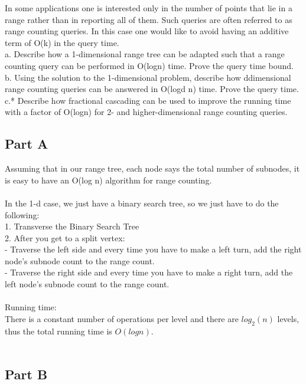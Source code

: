 \documentclass[11pt,psfig]{article}
\begin{document}
In some applications one is interested only in the number of points that
lie in a range rather than in reporting all of them. Such queries are often
referred to as range counting queries. In this case one would like to avoid
having an additive term of O(k) in the query time.\\
a. Describe how a 1-dimensional range tree can be adapted such that a
range counting query can be performed in O(logn) time. Prove the
query time bound.\\
b. Using the solution to the 1-dimensional problem, describe how ddimensional
range counting queries can be answered in O(logd n)
time. Prove the query time.\\
c.* Describe how fractional cascading can be used to improve the running
time with a factor of O(logn) for 2- and higher-dimensional range
counting queries.\\

\subsection*{Part A}

Assuming that in our range tree, each node says the total number of subnodes, it is easy to have an O(log n) algorithm for range counting. \\
\\
In the 1-d case, we just have a binary search tree, so we just have to do the following:\\
1. Transverse the Binary Search Tree\\
2. After you get to a split vertex:\\
- Traverse the left side and every time you have to make a left turn, add the right node's subnode count to the range count. \\
- Traverse the right side and every time you have to make a right turn, add the left node's subnode count to the range count. \\
\\
Running time:\\
There is a constant number of operations per level and there are $log_2(n)$ levels, thus the total running time is $O(log n)$. \\
\\

\subsection*{Part B}
\end{document}
